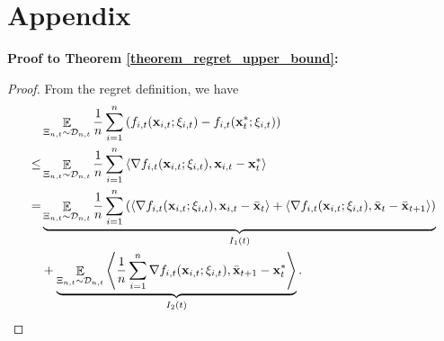 \documentclass{article}
\begin{document}
\balance





\onecolumn

\section*{Appendix}

\textbf{Proof to Theorem \ref{theorem_regret_upper_bound}:}
\begin{proof}
From the regret definition, we have
\begin{align}
\nonumber
& \mathop{\mathbb{E}}_{ \Xi_{n,t} \sim \mathcal{D}_{n,t} } \frac{1}{n}\sum_{i=1}^n \left(  f_{i,t}({\bf x}_{i,t};\xi_{i,t}) - f_{i,t}({\bf x}_t^\ast;\xi_{i,t})  \right) \\ \nonumber
\le & \mathop{\mathbb{E}}_{ \Xi_{n,t} \sim \mathcal{D}_{n,t} } \frac{1}{n}\sum_{i=1}^n \left\langle \nabla f_{i,t}({\bf x}_{i,t};\xi_{i,t}),  {\bf x}_{i,t} - {\bf x}_t^\ast  \right\rangle \\ \nonumber
= & \underbrace{ \mathop{\mathbb{E}}_{ \Xi_{n,t} \sim \mathcal{D}_{n,t} } \frac{1}{n}\sum_{i=1}^n   \left( \left\langle\nabla  f_{i,t}({\bf x}_{i,t};\xi_{i,t}), {\bf x}_{i,t} - \bar{{\bf x}}_t  \right\rangle + \left\langle\nabla  f_{i,t}({\bf x}_{i,t};\xi_{i,t}), \bar{{\bf x}}_t - \bar{{\bf x}}_{t+1}  \right\rangle  \right) }_{I_1(t)} \\ \nonumber 
&+ \underbrace{ \mathop{\mathbb{E}}_{ \Xi_{n,t} \sim \mathcal{D}_{n,t} } \left\langle\frac{1}{n}\sum_{i=1}^n\nabla f_{i,t}({\bf x}_{i,t};\xi_{i,t}), \bar{{\bf x}}_{t+1} - {\bf x}_t^\ast  \right\rangle }_{I_2(t)}. \nonumber
\end{align}


\end{proof}
\end{document}
